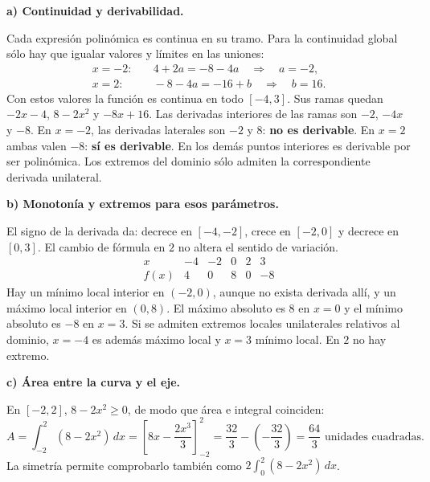 \textbf{a) Continuidad y derivabilidad.}\par\nopagebreak[4]
Cada expresión polinómica es continua en su tramo. Para la continuidad global sólo hay que igualar valores y límites en las uniones:
\[
\begin{aligned}
x=-2:&\quad4+2a=-8-4a\quad\Longrightarrow\quad a=-2,\\
x=2:&\quad-8-4a=-16+b\quad\Longrightarrow\quad b=16.
\end{aligned}
\]
Con estos valores la función es continua en todo $[-4,3]$. Sus ramas quedan $-2x-4$, $8-2x^2$ y $-8x+16$. Las derivadas interiores de las ramas son $-2$, $-4x$ y $-8$.
En $x=-2$, las derivadas laterales son $-2$ y $8$: \textbf{no es derivable}. En $x=2$ ambas valen $-8$: \textbf{sí es derivable}. En los demás puntos interiores es derivable por ser polinómica. Los extremos del dominio sólo admiten la correspondiente derivada unilateral.

\textbf{b) Monotonía y extremos para esos parámetros.}\par\nopagebreak[4]
El signo de la derivada da: decrece en $[-4,-2]$, crece en $[-2,0]$ y decrece en $[0,3]$. El cambio de fórmula en $2$ no altera el sentido de variación.
\[
\begin{array}{c|rrrrr}
x&-4&-2&0&2&3\\\hline
f(x)&4&0&8&0&-8
\end{array}
\]
Hay un mínimo local interior en $(-2,0)$, aunque no exista derivada allí, y un máximo local interior en $(0,8)$. El máximo absoluto es $8$ en $x=0$ y el mínimo absoluto es $-8$ en $x=3$. Si se admiten extremos locales unilaterales relativos al dominio, $x=-4$ es además máximo local y $x=3$ mínimo local. En $2$ no hay extremo.

\textbf{c) Área entre la curva y el eje.}\par\nopagebreak[4]
En $[-2,2]$, $8-2x^2\geq0$, de modo que área e integral coinciden:
\[
A=\int_{-2}^{2}(8-2x^2)\,dx
=\left[8x-\frac{2x^3}{3}\right]_{-2}^{2}
=\frac{32}{3}-\left(-\frac{32}{3}\right)
=\boxed{\frac{64}{3}\text{ unidades cuadradas}.}
\]
La simetría permite comprobarlo también como $2\int_0^2(8-2x^2)\,dx$.

